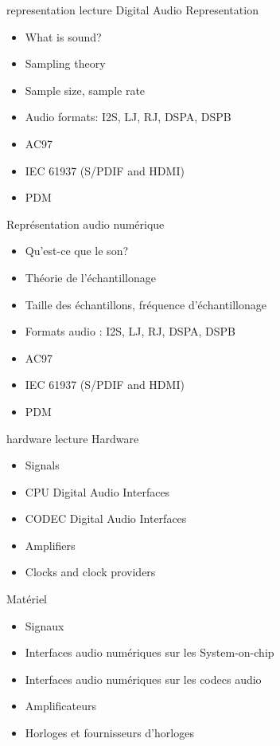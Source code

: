 {representation}
{lecture}
{Digital Audio Representation}
{
  \begin{itemize}
  \item What is sound?
  \item Sampling theory
  \item Sample size, sample rate
  \item Audio formats: I2S, LJ, RJ, DSPA, DSPB
  \item AC97
  \item IEC 61937 (S/PDIF and HDMI)
  \item PDM
  \end{itemize}
  \vspace{0.5em}
}
{Représentation audio numérique}
{
  \begin{itemize}
  \item Qu'est-ce que le son?
  \item Théorie de l'échantillonage
  \item Taille des échantillons, fréquence d'échantillonage
  \item Formats audio : I2S, LJ, RJ, DSPA, DSPB
  \item AC97
  \item IEC 61937 (S/PDIF and HDMI)
  \item PDM
  \end{itemize}
  \vspace{0.5em}
}
{hardware}
{lecture}
{Hardware}
{
  \begin{itemize}
  \item Signals
  \item CPU Digital Audio Interfaces
  \item CODEC Digital Audio Interfaces
  \item Amplifiers
  \item Clocks and clock providers
  \end{itemize}
  \vspace{0.5em}
}
{Matériel}
{
  \begin{itemize}
  \item Signaux
  \item Interfaces audio numériques sur les System-on-chip
  \item Interfaces audio numériques sur les codecs audio
  \item Amplificateurs
  \item Horloges et fournisseurs d'horloges
  \end{itemize}
  \vspace{0.5em}
}
